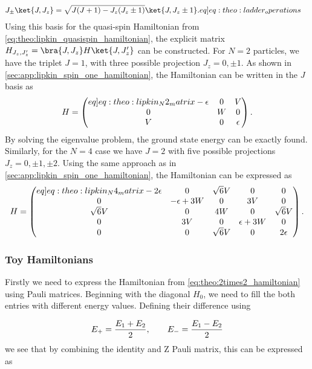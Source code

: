 \begin{align}
    J_\pm \ket{J,J_z} &= \sqrt{J(J+1)-J_z (J_z \pm 1)} \ket{J,J_z \pm 1}. \label[eq]{eq:theo:ladder_operations}
\end{align}
Using this basis for the quasi-spin Hamiltonian from \cref{eq:theo:lipkin_quasispin_hamiltonian}, the explicit matrix $H_{J_z,J'_z} = \bra{J,J_z} H \ket{J,J_z'}$ can be constructed. For $N=2$ particles, we have the triplet $J=1$, with three possible projection $J_z = 0, \pm 1$. As shown in \cref{sec:app:lipkin_spin_one_hamiltonian}, the Hamiltonian can be written in the $J$ basis as
\begin{align}
    H = \begin{pmatrix} \label[eq]{eq:theo:lipkin_N2_matrix}
        -\epsilon & 0 & V \\
        0 & W & 0 \\
        V & 0 & \epsilon
    \end{pmatrix}.
\end{align}
By solving the eigenvalue problem, the ground state energy can be exactly found. Similarly, for the $N=4$ case we have $J = 2$ with five possible projections $J_z = 0,\pm1,\pm2$. Using the same approach as in \cref{sec:app:lipkin_spin_one_hamiltonian}, the Hamiltonian can be expressed as  
\begin{align}
    H = \begin{pmatrix}\label[eq]{eq:theo:lipkin_N4_matrix}
        -2\epsilon & 0  & \sqrt{6}V &0 &0 \\
        0 & -\epsilon + 3W & 0 & 3V & 0 \\
        \sqrt{6}V & 0 & 4W & 0 & \sqrt{6}V \\
        0 & 3V & 0 & \epsilon + 3W & 0 \\
        0 & 0 & \sqrt{6}V & 0 & 2\epsilon
    \end{pmatrix}.
\end{align}

\subsubsection{Toy Hamiltonians}
Firstly we need to express the Hamiltonian from \cref{eq:theo:2times2_hamiltonian} using Pauli matrices. Beginning with the diagonal $H_0$, we need to fill the both entries with different energy values. Defining their difference using

\begin{align*}
    E_+ = \frac{E_1 + E_2}{2},\hspace{20px} E_- = \frac{E_1 - E_2}{2}
\end{align*}
we see that by combining the identity and Z Pauli matrix, this can be expressed as

